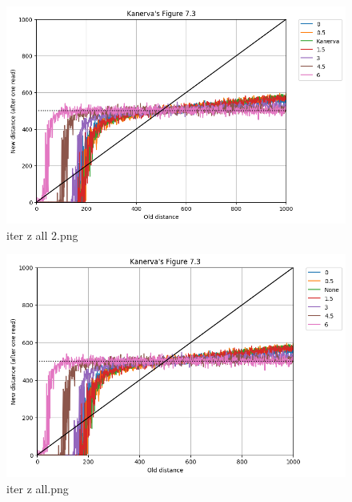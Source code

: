 \documentclass[11pt]{article} %
\begin{document}
\begin{figure}
  \includegraphics[width=\linewidth]{./images02/new-images/iter_z_all_2.png}
  \caption{iter z all 2.png}
  \label{fig:boat1}
\end{figure}



\begin{figure}
  \includegraphics[width=\linewidth]{./images02/new-images/iter_z_all.png}
  \caption{iter z all.png}
  \label{fig:boat1}
\end{figure}
\end{document}
